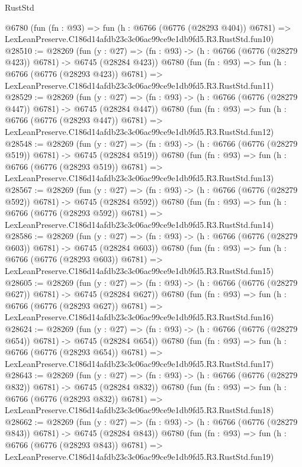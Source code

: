 \begin{lexlean}{RustStd}
\begin{coremodule}
    @6780
    (fun (fn : @93) =>
    fun (h : @6766 (@6776 (@28293 @404)) @6781) =>
    LexLeanPreserve.C186d14afdb23c3c06ac99ce9e1db9fd5.R3.RustStd.fun10)
@28510 := @28269
    (fun (y : @27) => (fn : @93) -> (h : @6766 (@6776 (@28279 @423)) @6781) -> @6745 (@28284 @423))
    @6780
    (fun (fn : @93) =>
    fun (h : @6766 (@6776 (@28293 @423)) @6781) =>
    LexLeanPreserve.C186d14afdb23c3c06ac99ce9e1db9fd5.R3.RustStd.fun11)
@28529 := @28269
    (fun (y : @27) => (fn : @93) -> (h : @6766 (@6776 (@28279 @447)) @6781) -> @6745 (@28284 @447))
    @6780
    (fun (fn : @93) =>
    fun (h : @6766 (@6776 (@28293 @447)) @6781) =>
    LexLeanPreserve.C186d14afdb23c3c06ac99ce9e1db9fd5.R3.RustStd.fun12)
@28548 := @28269
    (fun (y : @27) => (fn : @93) -> (h : @6766 (@6776 (@28279 @519)) @6781) -> @6745 (@28284 @519))
    @6780
    (fun (fn : @93) =>
    fun (h : @6766 (@6776 (@28293 @519)) @6781) =>
    LexLeanPreserve.C186d14afdb23c3c06ac99ce9e1db9fd5.R3.RustStd.fun13)
@28567 := @28269
    (fun (y : @27) => (fn : @93) -> (h : @6766 (@6776 (@28279 @592)) @6781) -> @6745 (@28284 @592))
    @6780
    (fun (fn : @93) =>
    fun (h : @6766 (@6776 (@28293 @592)) @6781) =>
    LexLeanPreserve.C186d14afdb23c3c06ac99ce9e1db9fd5.R3.RustStd.fun14)
@28586 := @28269
    (fun (y : @27) => (fn : @93) -> (h : @6766 (@6776 (@28279 @603)) @6781) -> @6745 (@28284 @603))
    @6780
    (fun (fn : @93) =>
    fun (h : @6766 (@6776 (@28293 @603)) @6781) =>
    LexLeanPreserve.C186d14afdb23c3c06ac99ce9e1db9fd5.R3.RustStd.fun15)
@28605 := @28269
    (fun (y : @27) => (fn : @93) -> (h : @6766 (@6776 (@28279 @627)) @6781) -> @6745 (@28284 @627))
    @6780
    (fun (fn : @93) =>
    fun (h : @6766 (@6776 (@28293 @627)) @6781) =>
    LexLeanPreserve.C186d14afdb23c3c06ac99ce9e1db9fd5.R3.RustStd.fun16)
@28624 := @28269
    (fun (y : @27) => (fn : @93) -> (h : @6766 (@6776 (@28279 @654)) @6781) -> @6745 (@28284 @654))
    @6780
    (fun (fn : @93) =>
    fun (h : @6766 (@6776 (@28293 @654)) @6781) =>
    LexLeanPreserve.C186d14afdb23c3c06ac99ce9e1db9fd5.R3.RustStd.fun17)
@28643 := @28269
    (fun (y : @27) => (fn : @93) -> (h : @6766 (@6776 (@28279 @832)) @6781) -> @6745 (@28284 @832))
    @6780
    (fun (fn : @93) =>
    fun (h : @6766 (@6776 (@28293 @832)) @6781) =>
    LexLeanPreserve.C186d14afdb23c3c06ac99ce9e1db9fd5.R3.RustStd.fun18)
@28662 := @28269
    (fun (y : @27) => (fn : @93) -> (h : @6766 (@6776 (@28279 @843)) @6781) -> @6745 (@28284 @843))
    @6780
    (fun (fn : @93) =>
    fun (h : @6766 (@6776 (@28293 @843)) @6781) =>
    LexLeanPreserve.C186d14afdb23c3c06ac99ce9e1db9fd5.R3.RustStd.fun19)

\end{coremodule}
\end{lexlean}

